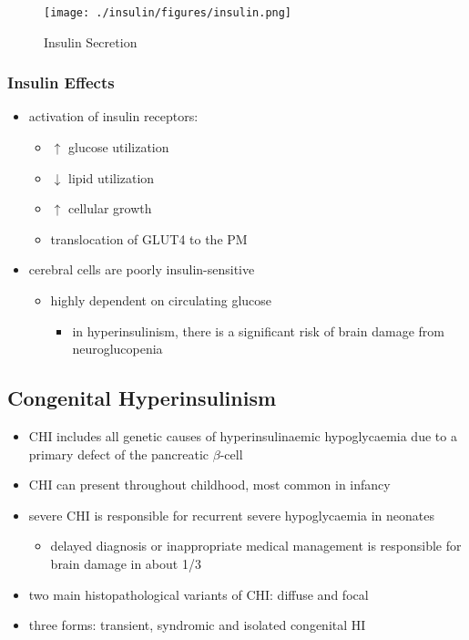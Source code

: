 \documentclass{scrartcl}
\begin{document}
\begin{figure}[htbp]
\centering
\texttt{[image: ./insulin/figures/insulin.png]}
\caption[insulin]{\label{fig:org8cee483}
Insulin Secretion}
\end{figure}

\subsubsection{Insulin Effects}
\label{sec:org7104fc3}
\begin{itemize}
\item activation of insulin receptors:
\begin{itemize}
\item \(\uparrow\) glucose utilization
\item \(\downarrow\) lipid utilization
\item \(\uparrow\) cellular growth
\item translocation of GLUT4 to the PM
\end{itemize}
\item cerebral cells are poorly insulin-sensitive
\begin{itemize}
\item highly dependent on circulating glucose
\begin{itemize}
\item in hyperinsulinism, there is a significant risk of brain damage
from neuroglucopenia
\end{itemize}
\end{itemize}
\end{itemize}

\subsection{Congenital Hyperinsulinism}
\label{sec:orgeb9fb12}
\begin{itemize}
\item CHI includes all genetic causes of hyperinsulinaemic
hypoglycaemia due to a primary defect of the pancreatic
\(\beta\)-cell
\item CHI can present throughout childhood, most common in infancy
\item severe CHI is responsible for recurrent severe hypoglycaemia in neonates
\begin{itemize}
\item delayed diagnosis or inappropriate medical management is responsible for brain damage in about 1/3
\end{itemize}
\item two main histopathological variants of CHI: diffuse and focal
\item three forms: transient, syndromic and isolated congenital HI
\end{itemize}
\end{document}
